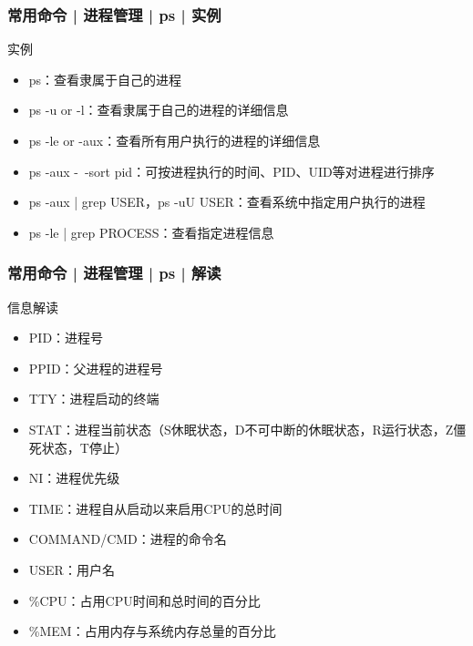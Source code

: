 \begin{frame}
  \frametitle{常用命令 | 进程管理 | ps | 实例}
  \begin{block}{实例}
    \begin{itemize}
      \item ps：查看隶属于自己的进程
      \item ps -u or -l：查看隶属于自己的进程的详细信息
      \item ps -le or -aux：查看所有用户执行的进程的详细信息
      \item ps -aux -\ -sort pid：可按进程执行的时间、PID、UID等对进程进行排序
      \item ps -aux | grep USER，ps -uU USER：查看系统中指定用户执行的进程
      \item ps -le | grep PROCESS：查看指定进程信息
    \end{itemize}
  \end{block}
\end{frame}

\begin{frame}
  \frametitle{常用命令 | 进程管理 | ps | 解读}
  \begin{block}{信息解读}
    \begin{itemize}
      \item PID：进程号
      \item PPID：父进程的进程号
      \item TTY：进程启动的终端
      \item STAT：进程当前状态（S休眠状态，D不可中断的休眠状态，R运行状态，Z僵死状态，T停止）
      \item NI：进程优先级
      \item TIME：进程自从启动以来启用CPU的总时间
      \item COMMAND/CMD：进程的命令名
      \item USER：用户名
      \item \%CPU：占用CPU时间和总时间的百分比
      \item \%MEM：占用内存与系统内存总量的百分比
    \end{itemize}
  \end{block}
\end{frame}

